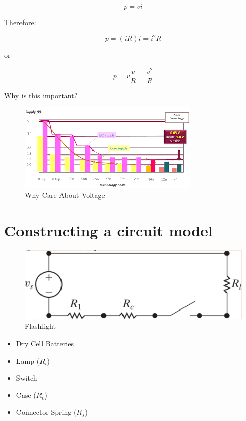 \documentclass[14pt]{memoir}
\begin{document}
\begin{equation}
p = vi
\end{equation}

Therefore:

\begin{equation}
p = (iR) i = i^2 R
\end{equation}

or

\begin{equation}
p = v \frac{v}{R} = \frac{v^2}{R}
\end{equation}

Why is this important?

\begin{figure}[H]
\begin{center}
\includegraphics[scale=1]{fig/transistorVoltage.png}
\caption{Why Care About Voltage}
\label{fig:tv}
\end{center}
\end{figure}

\section{Constructing a circuit model}

\begin{figure}[H]
\begin{center}
\includegraphics[scale=0.50]{fig/fig02_12.png}
\caption{Flashlight}
\label{fig:fig02_12}
\end{center}
\end{figure}

\begin{itemize}
\item Dry Cell Batteries
\item Lamp ($R_l$)
\item Switch
\item Case ($R_c$)
\item Connector Spring ($R_s$)
\end{itemize}
\end{document}
